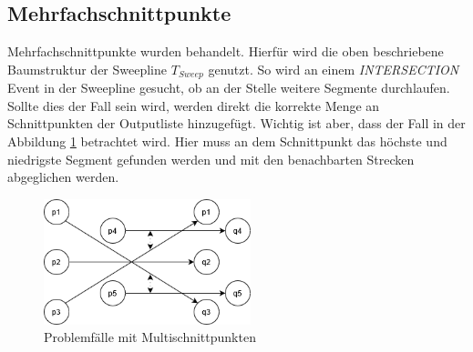 \documentclass[conference]{IEEEtran}
\begin{document}
	\subsection{Mehrfachschnittpunkte}
	Mehrfachschnittpunkte wurden behandelt. Hierfür wird die oben beschriebene Baumstruktur der Sweepline $T_{Sweep}$ genutzt. So wird an einem \textit{INTERSECTION} Event in der Sweepline gesucht, ob an der Stelle weitere Segmente durchlaufen. Sollte dies der Fall sein wird, werden direkt die korrekte Menge an Schnittpunkten der Outputliste hinzugefügt. Wichtig ist aber, dass der Fall in der Abbildung \ref{Multi} betrachtet wird. Hier muss an dem Schnittpunkt das höchste und niedrigste Segment gefunden werden und mit den benachbarten Strecken abgeglichen werden.
	\begin{figure}[h]
		\begin{center}
			\includegraphics[width=6cm]{MultiSchnitt.png}
			\caption{Problemfälle mit Multischnittpunkten}
			\label{Multi}
		\end{center}
	\end{figure}
	
\end{document}
